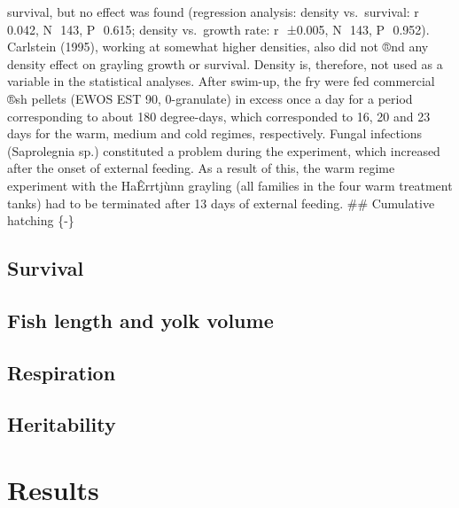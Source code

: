 \documentclass[utf8]{frontiersSCNS}
\begin{document}
survival, but no effect was found (regression analysis: density
vs.~survival: r  0.042, N  143, P  0.615; density vs.~growth rate: r 
±0.005, N  143, P  0.952). Carlstein (1995), working at somewhat higher
densities, also did not ®nd any density effect on grayling growth or
survival. Density is, therefore, not used as a variable in the
statistical analyses. After swim-up, the fry were fed commercial ®sh
pellets (EWOS EST 90, 0-granulate) in excess once a day for a period
corresponding to about 180 degree-days, which corresponded to 16, 20 and
23 days for the warm, medium and cold regimes, respectively. Fungal
infections (Saprolegnia sp.) constituted a problem during the
experiment, which increased after the onset of external feeding. As a
result of this, the warm regime experiment with the HaÊrrtjùnn grayling
(all families in the four warm treatment tanks) had to be terminated
after 13 days of external feeding. \#\# Cumulative hatching \{-\}

\hypertarget{survival}{%
\subsection*{Survival}\label{survival}}

\hypertarget{fish-length-and-yolk-volume}{%
\subsection*{Fish length and yolk
volume}\label{fish-length-and-yolk-volume}}

\hypertarget{respiration}{%
\subsection*{Respiration}\label{respiration}}

\hypertarget{heritability}{%
\subsection*{Heritability}\label{heritability}}

\hypertarget{results}{%
\section*{Results}\label{results}}
\end{document}
